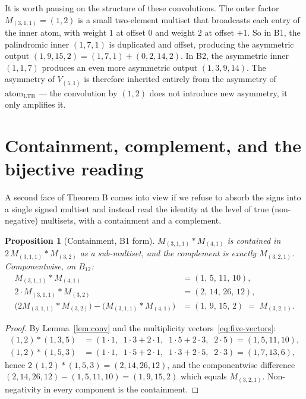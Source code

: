 \documentclass[11pt]{article}
\newtheorem{proposition}[theorem]{Proposition}
\theoremstyle{definition}
\begin{document}
It is worth pausing on the structure of these convolutions. The outer factor $M_{(3,1,1)} = (1,2)$ is a small two-element multiset that broadcasts each entry of the inner atom, with weight $1$ at offset $0$ and weight $2$ at offset $+1$. So in B1, the palindromic inner $(1,7,1)$ is duplicated and offset, producing the asymmetric output $(1, 9, 15, 2) = (1,7,1) + (0, 2, 14, 2)$. In B2, the asymmetric inner $(1,1,7)$ produces an even more asymmetric output $(1, 3, 9, 14)$. The asymmetry of $V_{(5,1)}$ is therefore inherited entirely from the asymmetry of $\mathrm{atom}_{\mathrm{LTR}}$ — the convolution by $(1,2)$ does not introduce new asymmetry, it only amplifies it.

\section{Containment, complement, and the bijective reading}

A second face of Theorem B comes into view if we refuse to absorb the signs into a single signed multiset and instead read the identity at the level of true (non-negative) multisets, with a containment and a complement.

\begin{proposition}[Containment, B1 form]\label{prop:contain-B1}
$M_{(3,1,1)} \ast M_{(4,1)}$ is contained in $2\,M_{(3,1,1)} \ast M_{(3,2)}$ as a sub-multiset, and the complement is exactly $M_{(3,2,1)}$. Componentwise, on $B_{12}$:
\begin{align*}
M_{(3,1,1)} \ast M_{(4,1)} &= (1,\, 5,\, 11,\, 10),\\
2 \cdot M_{(3,1,1)} \ast M_{(3,2)} &= (2,\, 14,\, 26,\, 12),\\
\bigl(2 M_{(3,1,1)} \ast M_{(3,2)}\bigr) - \bigl(M_{(3,1,1)} \ast M_{(4,1)}\bigr) &= (1,\, 9,\, 15,\, 2) \;=\; M_{(3,2,1)}.
\end{align*}
\end{proposition}

\begin{proof}
By Lemma~\ref{lem:conv} and the multiplicity vectors~\eqref{eq:five-vectors}:
\begin{align*}
(1,2) \ast (1,3,5) &= (1\cdot 1,\;\; 1\cdot 3 + 2\cdot 1,\;\; 1\cdot 5 + 2\cdot 3,\;\; 2\cdot 5) = (1,5,11,10),\\
(1,2) \ast (1,5,3) &= (1\cdot 1,\;\; 1\cdot 5 + 2\cdot 1,\;\; 1\cdot 3 + 2\cdot 5,\;\; 2\cdot 3) = (1,7,13,6),
\end{align*}
hence $2\,(1,2) \ast (1,5,3) = (2,14,26,12)$, and the componentwise difference $(2,14,26,12) - (1,5,11,10) = (1,9,15,2)$ which equals $M_{(3,2,1)}$. Non-negativity in every component is the containment.
\end{proof}
\end{document}
